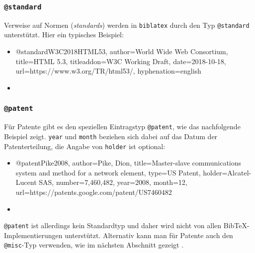 
\subsubsection{\texttt{@standard}}
\label{sec:@standard}


Verweise auf Normen (\emph{standards}) werden in \texttt{biblatex} durch den Typ \texttt{@standard}
unterstützt. Hier ein typisches Beispiel:
%
\begin{itemize}
\item[]
\begin{GenericCode}[numbers=none]
@standard{W3C2018HTML53,
	author={{World Wide Web Consortium}},
	title={HTML 5.3},
	titleaddon={W3C Working Draft},
	date={2018-10-18},
	url={https://www.w3.org/TR/html53/},
	hyphenation={english}
}
\end{GenericCode}
\item[\cite{W3C2018HTML53}] 
\end{itemize}
%


\subsubsection{\texttt{@patent}}
\label{sec:@patent}

Für Patente gibt es den speziellen Eintragstyp \texttt{@patent},
wie das nachfolgende Beispiel zeigt. 
\texttt{year} und \texttt{month} beziehen sich dabei auf das Datum der
Patenterteilung, die Angabe von \texttt{holder} ist optional:
%
\begin{itemize}
\item[]
\begin{GenericCode}[numbers=none]
@patent{Pike2008,
	author={Pike, Dion},
 	title={Master-slave communications system and method for a network element},
	type={US Patent},
	holder={Alcatel-Lucent SAS},
	number={7,460,482},
	year={2008},
	month={12},
	url={https://patents.google.com/patent/US7460482}
}
\end{GenericCode}
\item[\cite{Pike2008}] 
\end{itemize}
%
\texttt{@patent} ist allerdings kein Standardtyp und daher wird nicht
von allen BibTeX-Imple\-mentier\-ungen unterstützt.
Alternativ kann man für Patente auch den \texttt{@misc}-Typ verwenden,
wie im nächsten Abschnitt gezeigt \cite{Hough1962}.

